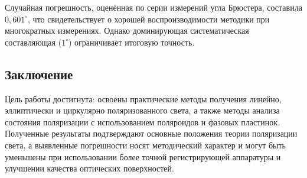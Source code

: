 \documentclass[a4paper]{article}
\begin{document}
Случайная погрешность, оценённая по серии измерений угла Брюстера, составила $0{,}601^\circ$, что свидетельствует о хорошей воспроизводимости методики при многократных измерениях. Однако доминирующая систематическая составляющая ($1^\circ$) ограничивает итоговую точность.

\subsection*{Заключение}
Цель работы достигнута: освоены практические методы получения линейно, эллиптически и циркулярно поляризованного света, а также методы анализа состояния поляризации с использованием поляроидов и фазовых пластинок. Полученные результаты подтверждают основные положения теории поляризации света, а выявленные погрешности носят методический характер и могут быть уменьшены при использовании более точной регистрирующей аппаратуры и улучшении качества оптических поверхностей.
\end{document}
